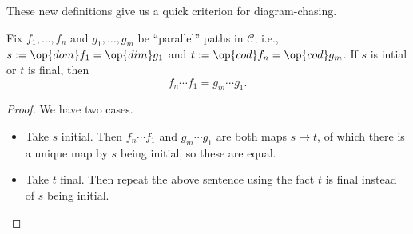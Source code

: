 These new definitions give us a quick criterion for diagram-chasing.
\begin{lemma}
	Fix $f_1,\ldots,f_n$ and $g_1,\ldots,g_m$ be ``parallel'' paths in $\mathcal C$; i.e., $s:=\op{dom}f_1=\op{dim}g_1$ and $t:=\op{cod}f_n=\op{cod}g_m$. If $s$ is intial or $t$ is final, then
	\[f_n\cdots f_1=g_m\cdots g_1.\]
\end{lemma}
\begin{proof}
	We have two cases.
	\begin{itemize}
		\item Take $s$ initial. Then $f_n\cdots f_1$ and $g_m\cdots g_1$ are both maps $s\to t$, of which there is a unique map by $s$ being initial, so these are equal.
		\item Take $t$ final. Then repeat the above sentence using the fact $t$ is final instead of $s$ being initial.
		\qedhere
	\end{itemize}
\end{proof}


